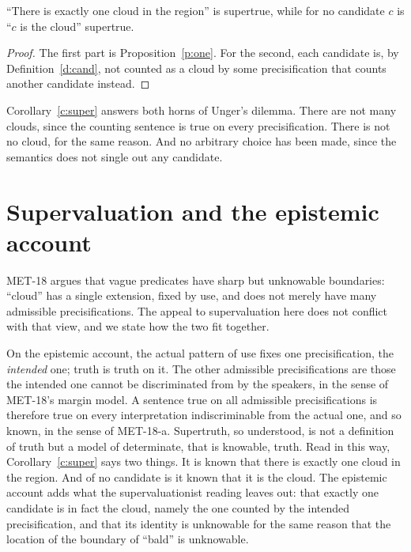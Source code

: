 \documentclass{situationist-preprint}
\begin{document}
\begin{corollary}\label{c:super}
\enquote{There is exactly one cloud in the region} is supertrue, while for no candidate $c$ is \enquote{$c$ is the cloud} supertrue.
\end{corollary}

\begin{proof}
The first part is Proposition~\ref{p:one}. For the second, each candidate is, by Definition~\ref{d:cand}, not counted as a cloud by some precisification that counts another candidate instead.
\end{proof}

Corollary~\ref{c:super} answers both horns of Unger's dilemma. There are not many clouds, since the counting sentence is true on every precisification. There is not no cloud, for the same reason. And no arbitrary choice has been made, since the semantics does not single out any candidate.

\section{Supervaluation and the epistemic account}

MET-18 argues that vague predicates have sharp but unknowable boundaries: \enquote{cloud} has a single extension, fixed by use, and does not merely have many admissible precisifications. The appeal to supervaluation here does not conflict with that view, and we state how the two fit together.

On the epistemic account, the actual pattern of use fixes one precisification, the \emph{intended} one; truth is truth on it. The other admissible precisifications are those the intended one cannot be discriminated from by the speakers, in the sense of MET-18's margin model. A sentence true on all admissible precisifications is therefore true on every interpretation indiscriminable from the actual one, and so known, in the sense of MET-18-a. Supertruth, so understood, is not a definition of truth but a model of determinate, that is knowable, truth. Read in this way, Corollary~\ref{c:super} says two things. It is known that there is exactly one cloud in the region. And of no candidate is it known that it is the cloud. The epistemic account adds what the supervaluationist reading leaves out: that exactly one candidate is in fact the cloud, namely the one counted by the intended precisification, and that its identity is unknowable for the same reason that the location of the boundary of \enquote{bald} is unknowable.
\end{document}
